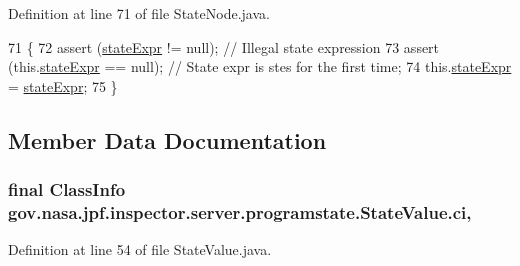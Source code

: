 Definition at line 71 of file State\+Node.\+java.


\begin{DoxyCode}
71                                                  \{
72     assert (\hyperlink{classgov_1_1nasa_1_1jpf_1_1inspector_1_1server_1_1programstate_1_1_state_node_a784a38d8edeb54f871891cb63de85585}{stateExpr} != null); \textcolor{comment}{// Illegal state expression}
73     assert (this.\hyperlink{classgov_1_1nasa_1_1jpf_1_1inspector_1_1server_1_1programstate_1_1_state_node_a784a38d8edeb54f871891cb63de85585}{stateExpr} == null); \textcolor{comment}{// State expr is stes for the first time;}
74     this.\hyperlink{classgov_1_1nasa_1_1jpf_1_1inspector_1_1server_1_1programstate_1_1_state_node_a784a38d8edeb54f871891cb63de85585}{stateExpr} = \hyperlink{classgov_1_1nasa_1_1jpf_1_1inspector_1_1server_1_1programstate_1_1_state_node_a784a38d8edeb54f871891cb63de85585}{stateExpr};
75   \}
\end{DoxyCode}


\subsection{Member Data Documentation}
\subsubsection[{\texorpdfstring{ci}{ci}}]{\setlength{\rightskip}{0pt plus 5cm}final Class\+Info gov.\+nasa.\+jpf.\+inspector.\+server.\+programstate.\+State\+Value.\+ci\hspace{0.3cm}{\ttfamily [protected]}, {\ttfamily [inherited]}}\hypertarget{classgov_1_1nasa_1_1jpf_1_1inspector_1_1server_1_1programstate_1_1_state_value_a0eb4aa1e630ed6372dcfb8c41ae7edc5}{}\label{classgov_1_1nasa_1_1jpf_1_1inspector_1_1server_1_1programstate_1_1_state_value_a0eb4aa1e630ed6372dcfb8c41ae7edc5}


Definition at line 54 of file State\+Value.\+java.


